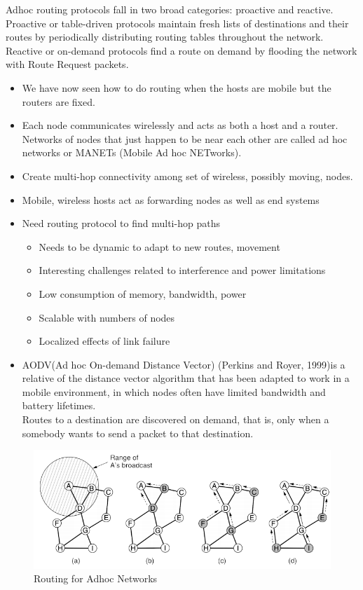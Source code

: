 \documentclass[twoside]{article}
\begin{document}
\newline Adhoc routing protocols fall in two broad categories: proactive and reactive. Proactive or table-driven protocols maintain fresh lists of destinations and their routes by periodically distributing routing tables throughout the network. Reactive or on-demand protocols find a route on demand by flooding the network with Route Request packets.
\begin{itemize}
    \item We have now seen how to do routing when the hosts are mobile but the routers are fixed.
    \item Each node communicates wirelessly and acts as both a host and a router. Networks of nodes that just happen to be near each other are called ad hoc networks or MANETs (Mobile Ad hoc NETworks).
    \item Create multi-hop connectivity among set of
wireless, possibly moving, nodes.
    \item Mobile, wireless hosts act as forwarding nodes as
well as end systems
    \item Need routing protocol to find multi-hop paths
    \begin{itemize}
        \item Needs to be dynamic to adapt to new routes,
movement
        \item Interesting challenges related to interference and power limitations
        \item Low consumption of memory, bandwidth, power
        \item Scalable with numbers of nodes
        \item Localized effects of link failure
    \end{itemize}
    \item AODV(Ad hoc On-demand Distance Vector)
(Perkins and Royer, 1999)is a relative of the distance vector
algorithm that has been adapted to work in a mobile environment, in
which nodes often have limited bandwidth and battery lifetimes.
    \\
    Routes to a destination are discovered on demand, that is, only when a
somebody wants to send a packet to that destination.
\end{itemize}
\newline \begin{figure}
    \centering
    \includegraphics[width=\textwidth]{images/rfahn.png}
    \caption{Routing for Adhoc Networks}
\end{figure}
\end{document}
